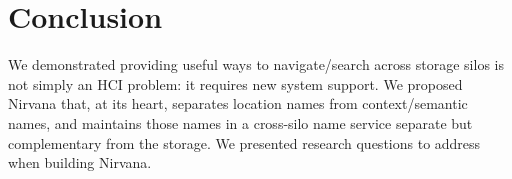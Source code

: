 \section{Conclusion}\label{sec:conclusion}

We demonstrated providing useful ways to navigate/search across storage silos is not simply an HCI problem: it requires new system support. 
We proposed Nirvana that, at its heart, separates location names from context/semantic names, and maintains those names in a cross-silo
name service separate but complementary from the storage. We presented research questions to address when building Nirvana.


